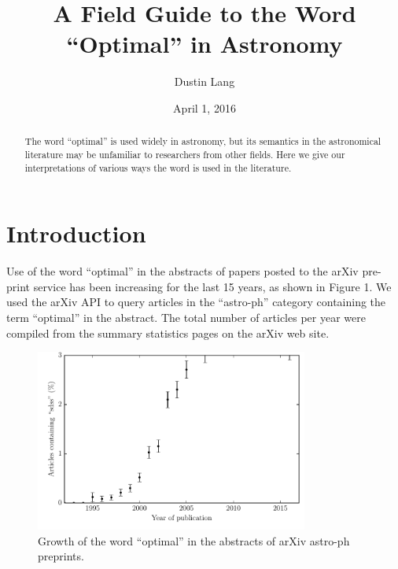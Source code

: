 \documentclass[12pt, preprint]{aastex}
\begin{document}
\title{A Field Guide to the Word ``Optimal'' in Astronomy}

\author{%
Dustin Lang%
}
\date{\centering April 1, 2016}

\begin{abstract}
The word ``optimal'' is used widely in astronomy, but its semantics
in the astronomical literature
may be unfamiliar to researchers from other fields.  Here we give
our interpretations of various ways the word is used in the literature.
\end{abstract}


\section{Introduction}

Use of the word ``optimal'' in the abstracts of papers posted to the
arXiv pre-print service has been increasing for the last 15 years, as
shown in Figure 1.  We used the arXiv API to query articles in the
``astro-ph'' category containing the term ``optimal'' in the abstract.
The total number of articles per year were compiled from the summary
statistics pages on the arXiv web site.

\begin{figure}[ht!]
\includegraphics[width=0.8\textwidth]{yearly.pdf}
\caption{Growth of the word ``optimal'' in the abstracts of arXiv astro-ph
  preprints.}
\end{figure}
\end{document}
